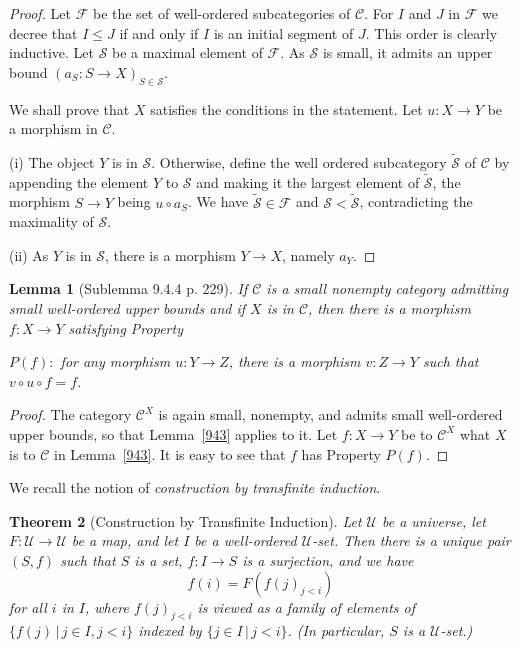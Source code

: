 \documentclass[12pt]{article}%
\newtheorem{thm}{Theorem}%
\newtheorem{lem}[thm]{Lemma}
\theoremstyle{remark}
\theoremstyle{definition}
\newcommand{\nn}{\noindent}
\newcommand{\cc}{\mathcal}
\newcommand{\C}{\mathcal C}
\newcommand{\U}{\mathcal U}
\begin{document}
\begin{proof}
Let $\cc F$ be the set of well-ordered subcategories of $\C$. For $I$ and $J$ in $\cc F$ we decree that $I\le J$ if and only if $I$ is an initial segment of $J$. This order is clearly inductive. Let $\cc S$ be a maximal element of $\cc F$. As $\cc S$ is small, it admits an upper bound $(a_S:S\to X)_{S\in\cc S}$. 

We shall prove that $X$ satisfies the conditions in the statement. Let $u:X\to Y$ be a morphism in $\C$. 

\nn(i) The object $Y$ is in $\cc S$. Otherwise, define the well ordered subcategory $\widetilde{\cc S}$ of $\C$ by appending the element $Y$ to $\cc S$ and making it the largest element of $\widetilde{\cc S}$, the morphism $S\to Y$ being $u\circ a_S$. We have $\widetilde{\cc S}\in \cc F$ and $\cc S<\widetilde{\cc S}$, contradicting the maximality of $\cc S$. 

\nn(ii) As $Y$ is in $\cc S$, there is a morphism $Y\to X$, namely $a_Y$.
\end{proof}

\begin{lem}[Sublemma 9.4.4 p. 229]\label{944}
If $\C$ is a small nonempty category admitting small well-ordered upper bounds and if $X$ is in $\C$, then there is a morphism $f:X\to Y$ satisfying Property 

\nn $P(f):$ for any morphism $u:Y\to Z$, there is a morphism $v:Z\to Y$ such that $v\circ u\circ f=f$.
\end{lem}

\begin{proof}
The category $\C^X$ is again small, nonempty, and admits small well-ordered upper bounds, so that Lemma~\ref{943} applies to it. Let $f:X\to Y$ be to $\C^X$ what $X$ is to $\C$ in Lemma~\ref{943}. It is easy to see that $f$ has Property $P(f)$. 
\end{proof}

We recall the notion of {\em construction by transfinite induction}.  %

\begin{thm}[Construction by Transfinite Induction]\label{meta} 
Let $\U$ be a universe, let $F:\U\to\U$ be a map, and let $I$ be a well-ordered $\U$-set. Then there is a unique pair $(S,f)$ such that $S$ is a set, $f:I\to S$ is a surjection, and we have $$
f(i)=F(f(j)_{j<i})
$$ 
for all $i$ in $I$, where $f(j)_{j<i}$ is viewed as a family of elements of $\{f(j)\,|\,j\in I,j<i\}$ indexed by $\{j\in I\,|\,j<i\}$. (In particular, $S$ is a $\U$-set.)
\end{thm}
\end{document}
